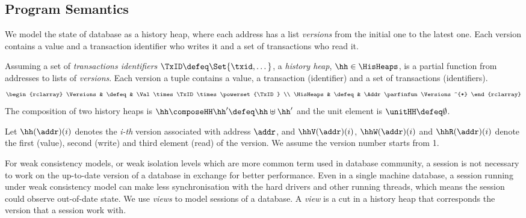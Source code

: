 \subsection{Program Semantics}

We model the state of database as a history heap, where each address has a list \emph{versions} from the initial one to the latest one.
Each version contains a value and a transaction identifier who writes it and a set of transactions who read it.

\begin{defn}
\label{def:his_heap}
Assuming a set of \emph{transactions identifiers} \( \TxID \defeq \Set{\txid, \dots}\), a \emph{history heap}, \( \hh \in \HisHeaps \), is a partial function from addresses to lists of \emph{versions}.
Each version a tuple contains a value, a transaction (identifier) and a set of transactions (identifiers).
\[
\begin{rclarray}
    \Versions & \defeq &  \Val \times \TxID \times \powerset{\TxID} \\
    \HisHeaps & \defeq & \Addr \parfinfun \Versions^{*}
\end{rclarray}
\]
The composition of two history heaps is \( \hh \composeHH \hh' \defeq \hh \uplus \hh' \) and the unit element is \( \unitHH \defeq \emptyset \). 
\end{defn}
 
Let \( \hh(\addr)(i)\) denotes the \emph{i-th} version associated with address \( \addr \), and \( \hhV(\addr)(i) \), \( \hhW(\addr)(i) \) and \( \hhR(\addr)(i) \) denote the first (value), second (write) and third element (read) of the version.
We assume the version number starts from 1.

For weak consistency models, or weak isolation levels which are more common term used in database community, a session is not necessary to work on the up-to-date version of a database in exchange for better performance. 
Even in a single machine database, a session running under weak consistency model can make less synchronisation with the hard drivers and other running threads, which means the session could observe out-of-date state.
We use \emph{views} to model sessions of a database.
A \emph{view} is a cut in a history heap that corresponds the version that a session work with.

